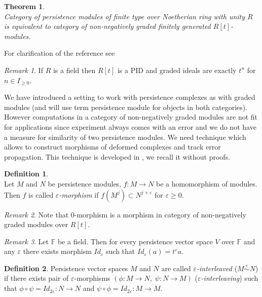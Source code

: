 \documentclass[a4paper, 12pt]{article}
\newtheorem{theorem}{Theorem}
\theoremstyle{definition}
\newtheorem{definition}{Definition}
\theoremstyle{remark}
\newtheorem{remark}{Remark}
\newcommand{\define}[1]{{\textit{#1}}}
\renewcommand{\geq}{\geqslant}
\begin{document}
\begin{theorem} {\cite[Theorem 3.1]{Zomorodian05}}\\
  Category of persistence modules of finite type over Noetherian ring with unity $R$ is equivalent to category of non-negatively graded finitely generated $R[t]$-modules.
\end{theorem}

For clarification of the reference see {\cite{Corbet18}}

\begin{remark}
  If $R$ is a field then $R[t]$ is a PID and graded ideals are exactly $t^n$ for $n \in I_{\geq 0}$.
\end{remark}

We have introduced a setting to work with persistence complexes as with graded modules (and will use term persistence module for objects in both categories). However computations in a category of non-negatively graded modules are not fit for applications since experiment always comes with an error and we do not have a measure for similarity of two persistence modules. We need technique which allows to construct morphisms of deformed complexes and track error propagation. This technique is developed in {\cite{GS16}}, we recall it without proofs.\\

\begin{definition} {\cite[Definition 2.7]{GS16}}\\
  Let $M$ and $N$ be persistence modules, $f : M \to N$ be a homomorphism of modules. Then $f$ is called \define{$\varepsilon$-morphism} if $f(M^j) \subset N^{j+\varepsilon}$ for $\varepsilon \geq 0$.
\end{definition}

\begin{remark}
  Note that $0$-morphism is a morphism in category of non-negatively graded modules over $R[t]$.
\end{remark}

\begin{remark}
  Let $\mathbb{F}$ be a field. Then for every persistence vector space $V$ over $\mathbb{F}$ and any $\varepsilon$ there exists morphism $Id_{\varepsilon}$ such that $Id_{\varepsilon}(a) = t^{\varepsilon}a$.
\end{remark}

\begin{definition}
  Persistence vector spaces $M$ and $N$ are called \define{$\varepsilon$-interleaved} ($M \stackrel{\varepsilon}{\sim} N$) if there exists pair of $\varepsilon$-morphisms $(\phi : M \to N,\;\psi : N \to M)$ (\define{$\varepsilon$-interleaving}) such that $\phi \circ \psi = Id_{2\varepsilon} : N \to N$ and $\psi \circ \phi = Id_{2\varepsilon} : M \to M$.
\end{definition}
\end{document}
